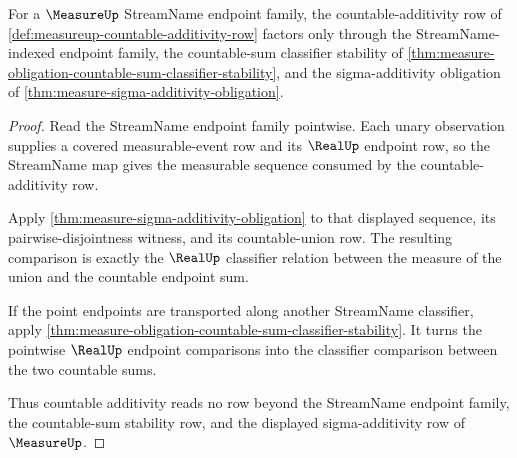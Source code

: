 \begin{theorem}
\label{thm:measure-streamname-countable-additivity-scope}
For a $\MeasureUp$ StreamName endpoint family, the countable-additivity row of
\autoref{def:measureup-countable-additivity-row} factors only through the
StreamName-indexed endpoint family, the countable-sum classifier stability of
\autoref{thm:measure-obligation-countable-sum-classifier-stability}, and the
sigma-additivity obligation of \autoref{thm:measure-sigma-additivity-obligation}.
\end{theorem}
\begin{proof}
Read the StreamName endpoint family pointwise. Each unary observation supplies
a covered measurable-event row and its $\RealUp$ endpoint row, so the
StreamName map gives the measurable sequence consumed by the
countable-additivity row.

Apply \autoref{thm:measure-sigma-additivity-obligation} to that displayed
sequence, its pairwise-disjointness witness, and its countable-union row. The
resulting comparison is exactly the $\RealUp$ classifier relation between the
measure of the union and the countable endpoint sum.

If the point endpoints are transported along another StreamName classifier,
apply
\autoref{thm:measure-obligation-countable-sum-classifier-stability}. It turns
the pointwise $\RealUp$ endpoint comparisons into the classifier comparison
between the two countable sums.

Thus countable additivity reads no row beyond the StreamName endpoint family,
the countable-sum stability row, and the displayed sigma-additivity row of
$\MeasureUp$.
\end{proof}


